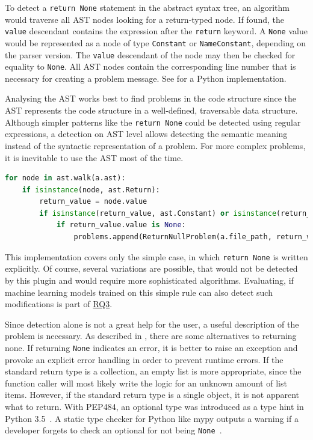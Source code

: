 \begin{description}
    To detect a \texttt{return None} statement in the abstract syntax tree, an algorithm would traverse all AST nodes looking for a return-typed node. If found, the \texttt{value} descendant contains the expression after the \texttt{return} keyword. A \texttt{None} value would be represented as a node of type \texttt{Constant} or \texttt{NameConstant}, depending on the parser version. The \texttt{value} descendant of the node may then be checked for equality to \texttt{None}. All AST nodes contain the corresponding line number that is necessary for creating a problem message. See  for a Python implementation. 


    Analysing the AST works best to find problems in the code structure since the AST represents the code structure in a well-defined, traversable data structure. Although simpler patterns like the \texttt{return None} could be detected using regular expressions, a detection on AST level allows detecting the semantic meaning instead of the syntactic representation of a problem. For more complex problems, it is inevitable to use the AST most of the time.
\end{description}

\begin{lstlisting}[float,floatplacement=h, language=Python, label=lst:return_none_detection_algorithm, caption={Detecting a \texttt{return None} by analsing the AST data structure.}]
for node in ast.walk(a.ast):
    if isinstance(node, ast.Return):
        return_value = node.value
        if isinstance(return_value, ast.Constant) or isinstance(return_value, ast.NameConstant):
            if return_value.value is None:
                problems.append(ReturnNullProblem(a.file_path, return_value.lineno))\end{lstlisting}


This implementation covers only the simple case, in which \texttt{return None} is written explicitly. Of course, several variations are possible, that would not be detected by this plugin and would require more sophisticated algorithms. Evaluating, if machine learning models trained on this simple rule can also detect such modifications is part of \hyperref[rq:3]{RQ3}.

Since detection alone is not a great help for the user, a useful description of the problem is necessary. 
As described in , there are some alternatives to returning none. If returning \texttt{None} indicates an error, it is better to raise an exception and provoke an explicit error handling in order to prevent runtime errors. If the standard return type is a collection, an empty list is more appropriate, since the function caller will most likely write the logic for an unknown amount of list items. However, if the standard return type is a single object, it is not apparent what to return. With PEP484, an optional type was introduced as a type hint in Python 3.5~\cite{van2014pep}. A static type checker for Python like mypy outputs a warning if a developer forgets to check an optional for not being \texttt{None}~\cite{lehtosalomypy}. 

